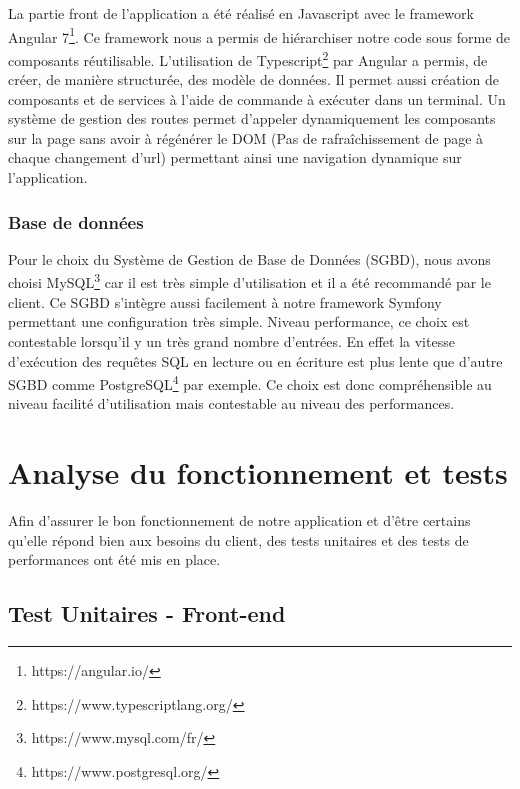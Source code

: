 \documentclass[12pt,a4paper]{article}
\begin{document}
    La partie front de l'application a été réalisé en Javascript avec le framework Angular 7\footnote{https://angular.io/}.
    Ce framework nous a permis de hiérarchiser notre code sous forme de composants réutilisable.
    L'utilisation de Typescript\footnote{https://www.typescriptlang.org/} par Angular a permis, de créer, de manière structurée, des modèle de données.
    Il permet aussi création de composants et de services à l'aide de commande à exécuter dans un terminal.
    Un système de gestion des routes permet d'appeler dynamiquement les composants sur la page sans avoir à régénérer le DOM (Pas de rafraîchissement de page à chaque changement d'url) permettant ainsi une navigation dynamique sur l'application.

    \subsubsection{Base de données}

    Pour le choix du Système de Gestion de Base de Données (SGBD), nous avons choisi MySQL\footnote{https://www.mysql.com/fr/} car il est très simple d'utilisation et il a été recommandé par le client.
    Ce SGBD s'intègre aussi facilement à notre framework Symfony permettant une configuration très simple.
    Niveau performance, ce choix est contestable lorsqu'il y un très grand nombre d'entrées. En effet la vitesse d'exécution des requêtes SQL en lecture ou en écriture est plus lente que d'autre SGBD comme PostgreSQL\footnote{https://www.postgresql.org/} par exemple.
    Ce choix est donc compréhensible au niveau facilité d'utilisation mais contestable au niveau des performances.

    \section{Analyse du fonctionnement et tests}

    Afin d'assurer le bon fonctionnement de notre application et d'être certains qu'elle répond bien aux besoins du client, des tests unitaires et des tests de performances ont été mis en place.

    \subsection{Test Unitaires - Front-end}
\end{document}
